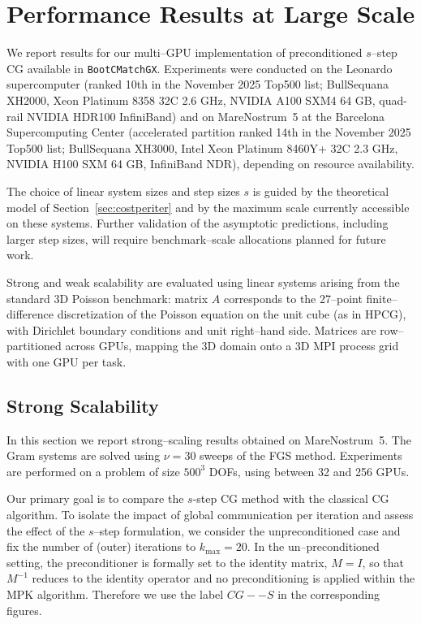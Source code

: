 \documentclass[pdflatex,sn-mathphys-num]{sn-jnl}%
\begin{document}
\section{Performance Results at Large Scale}
\label{sec:results}

We report results for our multi--GPU implementation of preconditioned $s$--step CG available in \texttt{BootCMatchGX}. Experiments were conducted on the Leonardo supercomputer (ranked 10th in the November 2025 Top500 list; BullSequana XH2000, Xeon Platinum 8358 32C 2.6 GHz, NVIDIA A100 SXM4 64 GB, quad-rail NVIDIA HDR100 InfiniBand) and on MareNostrum~5 at the Barcelona Supercomputing Center (accelerated partition ranked 14th in the November 2025 Top500 list; BullSequana XH3000, Intel Xeon Platinum 8460Y+ 32C 2.3 GHz, NVIDIA H100 SXM 64 GB, InfiniBand NDR), depending on resource availability.

The choice of linear system sizes and step sizes $s$ is guided by the theoretical model of Section~\ref{sec:costperiter} and by the maximum scale currently accessible on these systems. Further validation of the asymptotic predictions, including larger step sizes, will require benchmark--scale allocations planned for future work.

Strong and weak scalability are evaluated using linear systems arising from the standard 3D Poisson benchmark: matrix $A$ corresponds to the 27--point finite--difference discretization of the Poisson equation on the unit cube (as in HPCG), with Dirichlet boundary conditions and unit right--hand side. Matrices are row--partitioned across GPUs, mapping the 3D domain onto a 3D MPI process grid with one GPU per task.

\subsection{Strong Scalability}
\label{strong}

In this section we report strong--scaling results obtained on MareNostrum~5. The Gram systems are solved using $\nu = 30$ sweeps of the FGS method. Experiments are performed on a problem of size $500^3$ DOFs, using between 32 and 256 GPUs.

Our primary goal is to compare the $s$-step CG method with the classical CG algorithm. To isolate the impact of global communication per iteration and assess the effect of the $s$--step formulation, we consider the unpreconditioned case and fix the number of (outer) iterations to $k_{\max} = 20$. In the un--preconditioned setting, the preconditioner is formally set to the identity matrix, $M = I$, so that $M^{-1}$ reduces to the identity operator and no preconditioning is applied within the MPK algorithm.
Therefore we use the label $CG--S$ in the corresponding figures.
\end{document}

